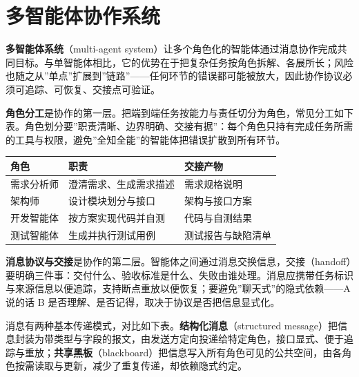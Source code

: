 \documentclass[
]{ctexbook}
\newcounter{none}
\begin{document}
\section{多智能体协作系统}\label{ux591aux667aux80fdux4f53ux534fux4f5cux7cfbux7edf}

\textbf{多智能体系统}（multi-agent
system）让多个角色化的智能体通过消息协作完成共同目标。与单智能体相比，它的优势在于把复杂任务按角色拆解、各展所长；风险也随之从''单点''扩展到''链路''------任何环节的错误都可能被放大，因此协作协议必须可追踪、可恢复、交接点可验证。

\textbf{角色分工}是协作的第一层。把端到端任务按能力与责任切分为角色，常见分工如下表。角色划分要''职责清晰、边界明确、交接有据''：每个角色只持有完成任务所需的工具与权限，避免''全知全能''的智能体把错误扩散到所有环节。

{\def\LTcaptype{none} %
\begin{longtable}[]{@{}lll@{}}
\toprule\noalign{}
角色 & 职责 & 交接产物 \\
\midrule\noalign{}
\endhead
\bottomrule\noalign{}
\endlastfoot
需求分析师 & 澄清需求、生成需求描述 & 需求规格说明 \\
架构师 & 设计模块划分与接口 & 架构与接口方案 \\
开发智能体 & 按方案实现代码并自测 & 代码与自测结果 \\
测试智能体 & 生成并执行测试用例 & 测试报告与缺陷清单 \\
\end{longtable}
}

\textbf{消息协议与交接}是协作的第二层。智能体之间通过消息交换信息，交接（handoff）要明确三件事：交付什么、验收标准是什么、失败由谁处理。消息应携带任务标识与来源信息以便追踪，支持断点重放以便恢复；要避免''聊天式''的隐式依赖------A
说的话 B 是否理解、是否记得，取决于协议是否把信息显式化。

消息有两种基本传递模式，对比如下表。\textbf{结构化消息}（structured
message）把信息封装为带类型与字段的报文，由发送方定向投递给特定角色，接口显式、便于追踪与重放；\textbf{共享黑板}（blackboard）把信息写入所有角色可见的公共空间，由各角色按需读取与更新，减少了重复传递，却依赖隐式约定。
\end{document}

